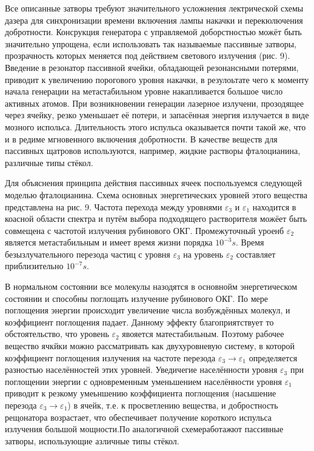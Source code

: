 \documentclass[a4paper,14pt,russian]{article}
\begin{document}
Все описанные затворы требуют значительного усложнения лектрической схемы дазера для синхронизации времени включения лампы накачки и перекюлючения добротности. Консрукция генератора с управляемой доборстностью можёт быть значительно упрощена, если использовать так называемые пассивные затворы, прозрачность которых меняется под действием светового излучения (рис. 9). Введение в резонатор пассивной ячейки, обладающей резонансными потерями, приводит к увеличению порогового уровня накачки, в резулоьтате чего к моменту начала генерации на метастабильном уровне накапливается большое число активных атомов. При возникновении генерации лазерное излучени, прозодящее через ячейку, резко уменьшает её потери, и запасённая энергия излучается в виде мозного испольса. Длительность этого испульса оказывается почти такой же, что и в редиме мгновенного включения добротности. В качестве веществ для пассивных щатровов используются, например, жидкие растворы фталоцианина, различные типы стёкол.

Для объяснения принципа действия пассивных ячеек поспользуемся следующей моделью фталоцианина. Схема основных энергетических уровней этого вещества представлена на рис. 9. Частота перехода между уровнями $\varepsilon_3$ и $\varepsilon_1$ находится в коасной области спектра и путём выбора подходящего растворителя можёет быть совмещена с частотой излучения рубинового ОКГ. Промежуточный уроенб $\varepsilon_2$ является метастабильным и имеет время жизни порядка $10^{-3} s$. Время безызлучательного перезода частиц с уровня $\varepsilon_3$ на уровень $\varepsilon_2$ составляет приблизительно $10^{-7} s$.

В нормальном состоянии все молекулы назодятся в основнойм энергетическом состоянии и способны поглощать излучение рубинового ОКГ. По мере поглощения энергии происходит увеличение числа возбуждённых молекул, и коэффициент поглощения падает. Данному эффекту благоприятствует то обстоятельство, что уровень $\varepsilon_2$ явояется матестабильным. Поэтому рабочее вещество ячкйки можно рассматривать как двухуровневую систему, в которой коэффициент поглощения излучения на частоте перезода $\varepsilon_3 \to \varepsilon_1$ определяется разностью населённостей этих уровней. Уведичегие населённости уровня $\varepsilon_3$ при поглощении энергии с одновременным уменьшением населённости уровня $\varepsilon_1$ приводит к резкому умеьншению коэффициента поглощения (насышение перезода $\varepsilon_3 \to \varepsilon_1$) в ячейк, т.е. к просветлению вещества, и добростность рещонатора возрастает, что обеспечивает получение короткого испульса излучения большой мощности.По аналогичной схемеработажют пассивные затворы, использующие азличные типы стёкол.
\end{document}
